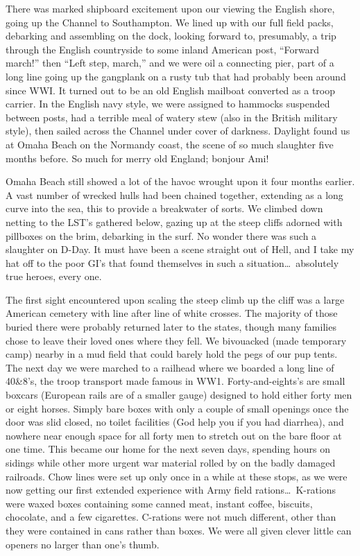 \documentclass[../m3y]{subfiles}
\begin{document}
There was marked shipboard excitement upon our viewing the English shore, going up the Channel to Southampton. We lined up with our full field packs, debarking and assembling on the dock, looking forward to, presumably, a trip through the English countryside to some inland American post, ``Forward march!'' then ``Left step, march,'' and we were oil a connecting pier, part of a long line going up the gangplank on a rusty tub that had probably been around since WW\thinspace I. It turned out to be an old English mailboat converted as a troop carrier. In the English navy style, we were assigned to hammocks suspended between posts, had a terrible meal of watery stew (also in the British military style), then sailed across the Channel under cover of darkness. Daylight found us at Omaha Beach on the Normandy coast, the scene of so much slaughter five months before. So much for merry old England; bonjour Ami!

Omaha Beach still showed a lot of the havoc wrought upon it four months earlier. A vast number of wrecked hulls had been chained together, extending as a long curve into the sea, this to provide a breakwater of sorts. We climbed down netting to the LST's gathered below, gazing up at the steep cliffs adorned with pillboxes on the brim, debarking in the surf. No wonder there was such a slaughter on D-Day. It must have been a scene straight out of Hell, and I take my hat off to the poor GI's that found themselves in such a situation\ldots\ absolutely true heroes, every one.

The first sight encountered upon scaling the steep climb up the cliff was a large American cemetery with line after line of white crosses. The majority of those buried there were probably returned later to the states, though many families chose to leave their loved ones where they fell. We bivouacked (made temporary camp) nearby in a mud field that could barely hold the pegs of our pup tents. The next day we were marched to a railhead where we boarded a long line of 40\&8's, the troop transport made famous in WW1. Forty-and-eights's are small boxcars (European rails are of a smaller gauge) designed to hold either forty men or eight horses. Simply bare boxes with only a couple of small openings once the door was slid closed, no toilet facilities (God help you if you had diarrhea), and nowhere near enough space for all forty men to stretch out on the bare floor at one time. This became our home for the next seven days, spending hours on sidings while other more urgent war material rolled by on the badly damaged railroads. Chow lines were set up only once in a while at these stops, as we were now getting our first extended experience with Army field rations\ldots\ K-rations were waxed boxes containing some canned meat, instant coffee, biscuits, chocolate, and a few cigarettes. C-rations were not much different, other than they were contained in cans rather than boxes. We were all given clever little can openers no larger than one's thumb.
\end{document}
